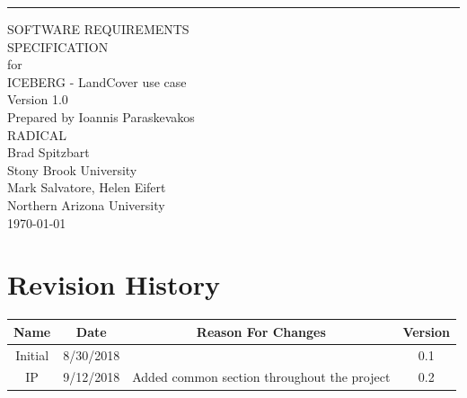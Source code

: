 \documentclass{scrreprt}
\date{}
\title{}
\def\myversion{1.0 }
\begin{document}
\begin{flushright}
    \rule{16cm}{5pt}\vskip1cm
    \begin{bfseries}
        \Huge{SOFTWARE REQUIREMENTS\\ SPECIFICATION}\\
        \vspace{1.9cm}
        for\\
        \vspace{1.9cm}
        ICEBERG - LandCover use case\\
        \vspace{1.9cm}
        \LARGE{Version \myversion}\\
        \vspace{1.9cm}
        Prepared by Ioannis Paraskevakos\\
        RADICAL\\
	Brad Spitzbart\\
        Stony Brook University\\
        Mark Salvatore, Helen Eifert\\
        Northern Arizona University\\
        \vspace{1cm}
        \today\\
    \end{bfseries}
\end{flushright}

\tableofcontents


\chapter*{Revision History}

\begin{center}
    \begin{tabular}{|c|c|c|c|}
        \hline
        Name & Date & Reason For Changes & Version\\\hline
        Initial & 8/30/2018 & & 0.1\\\hline
        IP & 9/12/2018 & Added common section throughout the project & 0.2\\\hline
    \end{tabular}
\end{center}
\end{document}
